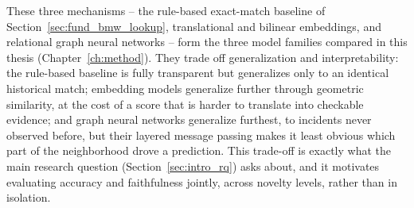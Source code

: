 These three mechanisms -- the rule-based exact-match baseline of
Section~\ref{sec:fund_bmw_lookup}, translational and bilinear embeddings,
and relational graph neural networks -- form the three model families
compared in this thesis (Chapter~\ref{ch:method}). They trade off
generalization and interpretability: the rule-based baseline is fully
transparent but generalizes only to an identical historical match;
embedding models generalize further through geometric similarity, at the
cost of a score that is harder to translate into checkable evidence; and
graph neural networks generalize furthest, to incidents never observed
before, but their layered message passing makes it least obvious which
part of the neighborhood drove a prediction. This trade-off is exactly
what the main research question (Section~\ref{sec:intro_rq}) asks about,
and it motivates evaluating accuracy and faithfulness jointly, across
novelty levels, rather than in isolation.
